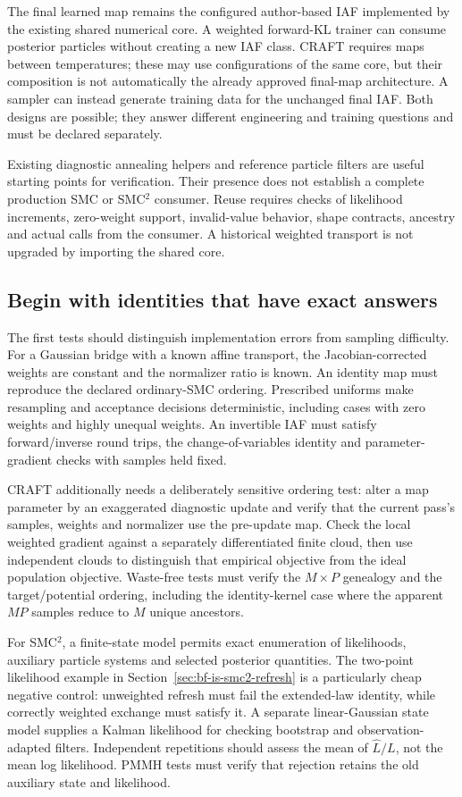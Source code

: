 The final learned map remains the configured author-based IAF implemented
by the existing shared numerical core. A weighted forward-KL trainer can
consume posterior particles without creating a new IAF class. CRAFT
requires maps between temperatures; these may use configurations of the
same core, but their composition is not automatically the already approved
final-map architecture. A sampler can instead generate training data for
the unchanged final IAF. Both designs are possible; they answer different
engineering and training questions and must be declared separately.

Existing diagnostic annealing helpers and reference particle filters are
useful starting points for verification. Their presence does not establish
a complete production SMC or SMC$^2$ consumer. Reuse requires checks of
likelihood increments, zero-weight support, invalid-value behavior, shape
contracts, ancestry and actual calls from the consumer. A historical
weighted transport is not upgraded by importing the shared core.

\subsection{Begin with identities that have exact answers}

The first tests should distinguish implementation errors from sampling
difficulty. For a Gaussian bridge with a known affine transport, the
Jacobian-corrected weights are constant and the normalizer ratio is known.
An identity map must reproduce the declared ordinary-SMC ordering.
Prescribed uniforms make resampling and acceptance decisions deterministic,
including cases with zero weights and highly unequal weights. An invertible
IAF must satisfy forward/inverse round trips, the change-of-variables
identity and parameter-gradient checks with samples held fixed.

CRAFT additionally needs a deliberately sensitive ordering test: alter a
map parameter by an exaggerated diagnostic update and verify that the
current pass's samples, weights and normalizer use the pre-update map.
Check the local weighted gradient against a separately differentiated
finite cloud, then use independent clouds to distinguish that empirical
objective from the ideal population objective. Waste-free tests must verify
the $M\times P$ genealogy and the target/potential ordering, including the
identity-kernel case where the apparent $MP$ samples reduce to $M$ unique
ancestors.

For SMC$^2$, a finite-state model permits exact enumeration of likelihoods,
auxiliary particle systems and selected posterior quantities. The two-point
likelihood example in Section~\ref{sec:bf-is-smc2-refresh} is a particularly
cheap negative control: unweighted refresh must fail the extended-law
identity, while correctly weighted exchange must satisfy it. A separate
linear-Gaussian state model supplies a Kalman likelihood for checking
bootstrap and observation-adapted filters. Independent repetitions should
assess the mean of $\widehat L/L$, not the mean log likelihood. PMMH tests
must verify that rejection retains the old auxiliary state and likelihood.

